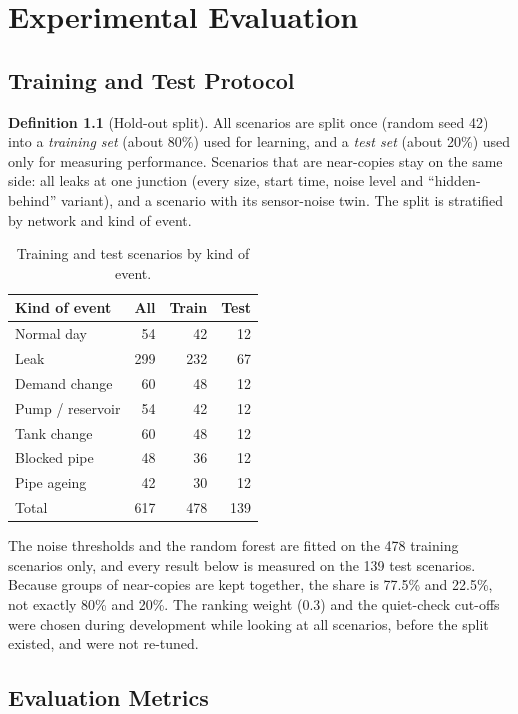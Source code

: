 \documentclass[11pt,letterpaper]{report}
\theoremstyle{definition}
\newtheorem{definition}[theorem]{Definition}
\theoremstyle{plain}
\theoremstyle{remark}
\begin{document}
\chapter{Experimental Evaluation}
\section{Training and Test Protocol}
\begin{definition}[Hold-out split]\label{def:split}
All scenarios are split once (random seed 42) into a \emph{training set} (about 80\%) used for learning, and a \emph{test set} (about 20\%) used only for measuring performance. Scenarios that are near-copies stay on the same side: all leaks at one junction (every size, start time, noise level and ``hidden-behind'' variant), and a scenario with its sensor-noise twin. The split is stratified by network and kind of event.
\end{definition}
\begin{table}[H]
\centering\small
\caption{Training and test scenarios by kind of event.}\label{tab:split}
\centering\setlength{\tabcolsep}{4pt}
\begin{tabular}{@{}lrrr@{}}
\toprule
Kind of event & All & Train & Test \\
\midrule
Normal day & 54 & 42 & 12 \\
Leak & 299 & 232 & 67 \\
Demand change & 60 & 48 & 12 \\
Pump / reservoir & 54 & 42 & 12 \\
Tank change & 60 & 48 & 12 \\
Blocked pipe & 48 & 36 & 12 \\
Pipe ageing & 42 & 30 & 12 \\
\midrule
Total & 617 & 478 & 139 \\
\bottomrule
\end{tabular}
\end{table}
The noise thresholds and the random forest are fitted on the 478 training scenarios only, and every result below is measured on the 139 test scenarios. Because groups of near-copies are kept together, the share is 77.5\% and 22.5\%, not exactly 80\% and 20\%. The ranking weight (0.3) and the quiet-check cut-offs were chosen during development while looking at all scenarios, before the split existed, and were not re-tuned.

\section{Evaluation Metrics}
\end{document}

